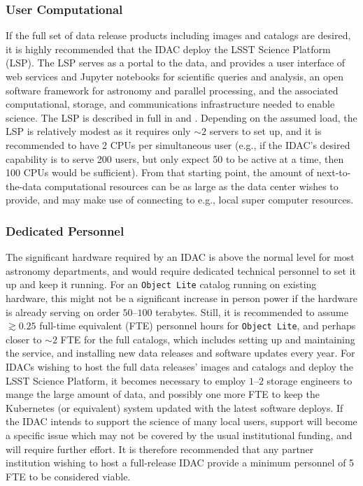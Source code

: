 \subsubsection{User Computational}
If the full set of data release products including images and catalogs are desired, it is highly recommended that the IDAC deploy the LSST Science Platform (LSP). The LSP serves as a portal to the data, and provides a user interface of web services and Jupyter notebooks for scientific queries and analysis, an open software framework for astronomy and parallel processing, and the associated computational, storage, and communications infrastructure needed to enable science. The LSP is described in full in  and . Depending on the assumed load, the LSP is relatively modest as it requires only $\sim2$ servers to set up, and it is recommended to have 2 CPUs per simultaneous user (e.g., if the IDAC's desired capability is to serve 200 users, but only expect 50 to be active at a time, then 100 CPUs would be sufficient). From that starting point, the amount of next-to-the-data computational resources can be as large as the data center wishes to provide, and may make use of connecting to e.g., local super computer resources.

\subsubsection{Dedicated Personnel}
The significant hardware required by an IDAC is above the normal level for most astronomy departments, and would require dedicated technical personnel to set it up and keep it running. For an {\tt Object Lite} catalog running on existing hardware, this might not be a significant increase in person power if the hardware is already serving on order $50$--$100$ terabytes. Still, it is recommended to assume $\gtrsim0.25$ full-time equivalent (FTE) personnel hours for {\tt Object Lite}, and perhaps closer to $\sim2$ FTE for the full catalogs, which includes setting up and maintaining the service, and installing new data releases and software updates every year. For IDACs wishing to host the full data releases' images and catalogs and deploy the LSST Science Platform, it becomes necessary to employ $1$--$2$ storage engineers to mange the large amount of data, and possibly one more FTE to keep the Kubernetes (or equivalent) system updated with the latest software deploys. If the IDAC intends to support the science of many local users, support will become a specific issue which may not be covered by the usual institutional funding, and will require further effort. It is therefore recommended that any partner institution wishing to host a full-release IDAC provide a minimum personnel of 5 FTE to be considered viable.


